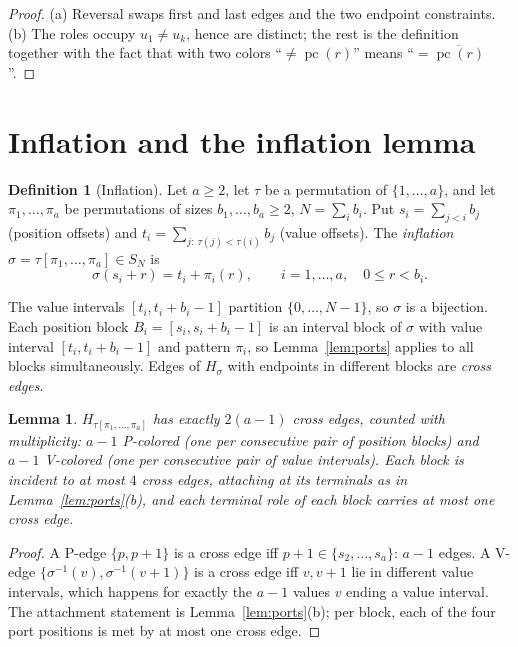 \documentclass[11pt]{article}
\newtheorem{lemma}[theorem]{Lemma}
\theoremstyle{definition}
\newtheorem{definition}[theorem]{Definition}
\newcommand{\inv}[1]{#1^{-1}}
\DeclareMathOperator{\pc}{pc}
\begin{document}
\begin{proof}
(a) Reversal swaps first and last edges and the two endpoint constraints. (b) The roles
occupy $u_1 \ne u_k$, hence are distinct; the rest is the definition together with the
fact that with two colors ``$\ne\pc(r)$'' means ``$=\overline{\pc(r)}$''.
\end{proof}

\section{Inflation and the inflation lemma}\label{sec:inflation}

\begin{definition}[Inflation]\label{def:inflation}
Let $a \ge 2$, let $\tau$ be a permutation of $\{1, \dots, a\}$, and let
$\pi_1, \dots, \pi_a$ be permutations of sizes $b_1, \dots, b_a \ge 2$,
$N = \sum_i b_i$. Put $s_i = \sum_{j < i} b_j$ (position offsets) and
$t_i = \sum_{j:\ \tau(j) < \tau(i)} b_j$ (value offsets). The \emph{inflation}
$\sigma = \tau[\pi_1, \dots, \pi_a] \in S_N$ is
\[
\sigma(s_i + r) = t_i + \pi_i(r), \qquad i = 1, \dots, a,\quad 0 \le r < b_i .
\]
\end{definition}

The value intervals $[t_i, t_i + b_i - 1]$ partition $\{0, \dots, N-1\}$, so $\sigma$
is a bijection. Each position block $B_i = [s_i, s_i + b_i - 1]$ is an interval block
of $\sigma$ with value interval $[t_i, t_i + b_i - 1]$ and pattern $\pi_i$, so
Lemma~\ref{lem:ports} applies to all blocks simultaneously. Edges of $H_\sigma$ with
endpoints in different blocks are \emph{cross edges}.

\begin{lemma}\label{lem:crosscount}
$H_{\tau[\pi_1,\dots,\pi_a]}$ has exactly $2(a-1)$ cross edges, counted with
multiplicity: $a-1$ P-colored (one per consecutive pair of position blocks) and $a-1$
V-colored (one per consecutive pair of value intervals). Each block is incident to at
most $4$ cross edges, attaching at its terminals as in Lemma~\ref{lem:ports}(b), and
each terminal role of each block carries at most one cross edge.
\end{lemma}

\begin{proof}
A P-edge $\{p, p+1\}$ is a cross edge iff $p+1 \in \{s_2, \dots, s_a\}$: $a-1$ edges. A
V-edge $\{\inv\sigma(v), \inv\sigma(v+1)\}$ is a cross edge iff $v, v+1$ lie in
different value intervals, which happens for exactly the $a-1$ values $v$ ending a value
interval. The attachment statement is Lemma~\ref{lem:ports}(b); per block, each of the
four port positions is met by at most one cross edge.
\end{proof}
\end{document}
